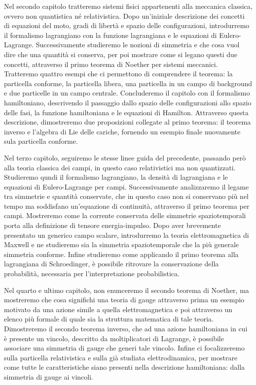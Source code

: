     Nel secondo capitolo tratteremo sistemi fisici appartenenti alla meccanica classica, ovvero non quantistica né relativistica. Dopo un'iniziale descrizione dei concetti di equazioni del moto, gradi di libertà e spazio delle configurazioni, introdurremo il formalismo lagrangiano con la funzione lagrangiana e le equazioni di Eulero-Lagrange. Successivamente studieremo le nozioni di simmetria e che cosa vuol dire che una quantità si conserva, per poi mostrare come si legano questi due concetti, attraverso il primo teorema di Noether per sistemi meccanici. Tratteremo quattro esempi che ci permettono di comprendere il teorema: la particella conforme, la particella libera, una particella in un campo di background e due particelle in un campo centrale. Concluderemo il capitolo con il formalismo hamiltoniano, descrivendo il passaggio dallo spazio delle configurazioni allo spazio delle fasi, la funzione hamiltoniana e le equazioni di Hamilton. Attraverso questa descrizione, dimostreremo due proposizioni collegate al primo teorema: il teorema inverso e l'algebra di Lie delle cariche, fornendo un esempio finale nuovamente sula particella conforme.

    Nel terzo capitolo, seguiremo le stesse linee guida del precedente, passando però alla teoria classica dei campi, in questo caso relativistici ma non quantizzati. Studieremo qundi il formalismo lagrangiano, la densità di lagrangiana e le equazioni di Eulero-Lagrange per campi. Successivamente analizzaremo il legame tra simmetrie e quantità conservate, che in questo caso non si conservano più nel tempo ma soddisfano un'equazione di continuità, attraverso il primo teorema per campi. Mostreremo come la corrente conservata delle simmetrie spaziotemporali porta alla definizione di tensore energia-impulso. Dopo aver brevemente presentato un generico campo scalare, introdurremo la teoria elettromagnetica di Maxwell e ne studieremo sia la simmetria spaziotemporale che la più generale simmetria conforme. Infine studieremo come applicando il primo teorema alla lagrangiana di Schroedinger, è possibile ritrovare la conservazione della probabilità, necessaria per l'interpretazione probabilistica.

    Nel quarto e ultimo capitolo, non enunceremo il secondo teorema di Noether, ma mostreremo che cosa significhi una teoria di gauge attraverso prima un esempio motivato da una azione simile a quella elettromagnetica e poi attraverso un elenco più formale di quale sia la struttura matematica di tale teoria. Dimostreremo il secondo teorema inverso, che ad una azione hamiltoniana in cui è presente un vincolo, descritto da moltiplicatori di Lagrange, è possibile associare una simmetria di gauge che generi tale vincolo. Infine ci focalizzeremo sulla particella relativistica e sulla già studiata elettrodinamica, per mostrare come tutte le caratteristiche siano presenti nella descrizione hamiltoniana: dalla simmetria di gauge ai vincoli. 

